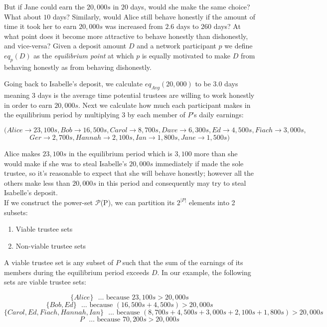 \documentclass{report}
\begin{document}
			But if Jane could earn the $20,000s$ in $20$ days, would she make the same choice? What about $10$ days? Similarly, would Alice still behave honestly if the amount of time it took her to earn $20,000s$ was increased from $2.6$ days to $260$ days? At what point does it become more attractive to behave honestly than dishonestly,   and vice-versa? Given a deposit amount $D$ and a network participant $p$ we define $eq_p(D)$ as the \textit{equilibrium point} at which $p$ is equally motivated to make $D$ from behaving honestly as from behaving dishonestly.
			
			Going back to Isabelle's deposit, we calculate $eq_{Avg}(20,000)$ to be $3.0$ days meaning 3 days is the average time potential trustees are willing to work honestly in order to earn $20,000s$. Next we calculate how much each participant makes in the equilibrium period by multiplying $3$ by each member of $P$'s daily earnings:
			
			\[(Alice \rightarrow 23,100s, Bob \rightarrow 16,500s, Carol \rightarrow 8,700s, Dave \rightarrow 6,300s, Ed \rightarrow 4,500s, Fiach \rightarrow 3,000s,\]
			\[Ger \rightarrow 2,700s, Hannah \rightarrow 2,100s, Ian \rightarrow 1,800s, Jane \rightarrow 1,500s)\]
			
			Alice makes $23,100s$ in the equilibrium period which is $3,100$ more than she would make if she was to steal Isabelle's $20,000s$ immediately if made the sole trustee, so it's reasonable to expect that she will behave honestly; however all the others make less than $20,000s$ in this period and consequently may try to steal Isabelle's deposit. \\
			
			If we construct the power-set $\mathcal{P}$(P), we can partition its $2^{|P|}$ elements into 2 subsets:
			\begin{enumerate}
				\item Viable trustee sets 
				\item Non-viable trustee sets 
			\end{enumerate}
			
			A viable trustee set is any subset of $P$ such that the sum of the earnings of its members during the equilibrium period  exceeds $D$. In our example, the following sets are viable trustee sets:
			
			\[ \{ Alice \} \mbox{  } \dots \mbox{ because } 23,100s > 20,000s \]
			\[ \{ Bob, Ed \} \mbox{  } \dots \mbox{ because } (16,500s + 4,500s) > 20,000s \]
			\[ \{ Carol, Ed, Fiach, Hannah, Ian \} \mbox{  } \dots \mbox{ because } (8,700s + 4,500s + 3,000s + 2,100s + 1,800s) > 20,000s \]
			\[ P \mbox{  } \dots \mbox{ because } 70,200s > 20,000s \]
			
\end{document}
